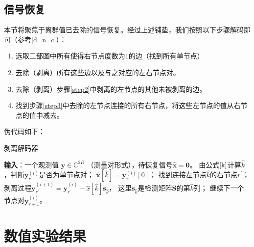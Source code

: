 \documentclass[AutoFakeBold]{LZUThesis}
\begin{document}
\section{信号恢复}
\label{solu}

本节将聚焦于离群值已去除的信号恢复。经过上述铺垫，我们按照以下步骤解码即可（参考\ref{d_n_c}）：

\begin{enumerate}[1) ]
    \item 选取二部图中所有使得右节点度数为1的边（找到所有单节点）
    \item \label{step2}去除（剥离）所有这些边以及与之对应的左右节点对。
    \item \label{step3}去除（剥离）步骤\ref{step2}中剥离的左节点的其他未被剥离的边。
    \item 找到步骤\ref{step3}中去除的左节点连接的所有右节点，将这些左节点的值从右节点的值中减去。
\end{enumerate}
伪代码如下：

\begin{algorithm}[H]
    \caption{剥离解码器\label{Alg:peeling_decoder}}
    \begin{algorithmic}[1]
        \State \textbf{输入}：一个观测值 $ \mathbf{y} \in \mathbb{C}^{2R} $ （测量对形式），待恢复信号$\mathbf{\hat x} = \mathbf{0}$。
            \State 由公式$\ref{k}$计算$\hat k$，判断$\mathbf{y}_r^{(i)}$是否为单节点对；
                    \State $\mathbf{\hat x}[\hat k] = \mathbf{y}_r^{(i)}[0]$；
                        \State 找到连接左节点$\hat k$的右节点$r^{\prime}$；
                        \State 剥离过程$\mathbf{y}_{r^{\prime}}^{(i+1)} = \mathbf{y}_{r^{\prime}}^{(i)} - \hat{x}[\hat k]\mathbf{s}_{\hat k}$，
                        这里$\mathbf{s}_{\hat k}$是检测矩阵$\mathbf{S}$的第$\hat k$列；
                    \EndFor
                \Else
                    \State 继续下一个节点对$\mathbf{y}_{r+1}^{(i)}$。
                \EndIf
            \EndFor
        \EndFor
    \end{algorithmic}
\end{algorithm}

\chapter{数值实验结果}
\label{result}
\end{document}
